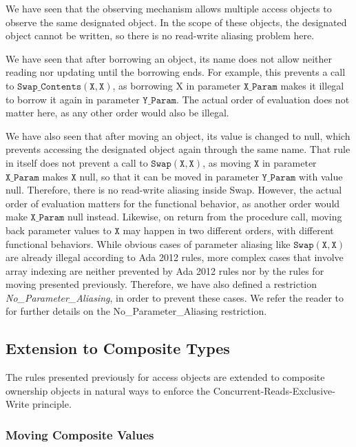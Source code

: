 \documentclass{llncs}
\newcommand\var[1]{\ensuremath{\mathtt{#1}}}
\begin{document}
We have seen that the observing mechanism allows multiple access objects to observe the same designated object. In the scope of these objects, the designated object
cannot be written, so there is no read-write aliasing problem here.

\smallskip
We have seen that after borrowing an object, its name does not allow neither reading nor updating until the borrowing ends. For example, this prevents a call to \var{Swap\_Contents (X, X)},
as borrowing X in parameter \var{X\_Param} makes it illegal to borrow it again in parameter \var{Y\_Param}. The actual order of evaluation does not matter here, as any other order would also be illegal.

\smallskip
We have also seen that after moving an object, its value is changed to null, which prevents accessing the designated object again through the same name.
That rule in itself does not prevent a call to \var{Swap(X, X)}, as moving \var{X} in parameter \var{X\_Param} makes \var{X} null, so that it can be moved in parameter \var{Y\_Param} with value null.
Therefore, there is no read-write aliasing inside Swap. However, the actual order of evaluation matters for the functional behavior, as another order would make \var{X\_Param} null
instead. Likewise, on return from the procedure call, moving back parameter values to \var{X} may happen in two different orders, with different functional behaviors.
While obvious cases of parameter aliasing like \var{Swap(X,X)} are already illegal according to Ada 2012 rules, more complex cases that involve array indexing are neither
prevented by Ada 2012 rules nor by the rules for moving presented previously. Therefore, we have also defined a restriction \textit{No\_Parameter\_Aliasing},
in order to prevent these cases. We refer the reader to \cite{AI2017} for further details on the No\_Parameter\_Aliasing restriction.


\subsection{Extension to Composite Types} 
\label{subsec:ownershipComposite}

The rules presented previously for access objects are extended to composite ownership objects in natural ways to enforce the Concurrent-Reads-Exclusive-Write principle. 

\subsubsection{Moving Composite Values}
\label{subsubsec:movingComposite}
\ \\
\end{document}
